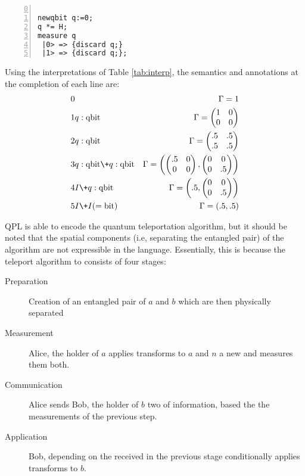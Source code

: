 \begin{Verbatim}[numbers=left,numbersep=6pt,firstnumber=0]

newqbit q:=0;
q *= H;
measure q
 |0> => {discard q;}
 |1> => {discard q;};
\end{Verbatim}

Using the interpretations of Table \ref{tab:interp}, the semantics and annotations at the
completion of each line are:
\begin{eqnarray*}
  0 & &\Gamma=1\\
  1 & q:\text{qbit} & \Gamma=\begin{pmatrix}1&0\\0&0\end{pmatrix}\\
  2 & q:\text{qbit} & \Gamma=\begin{pmatrix}.5&.5\\.5&.5\end{pmatrix}\\
  3 & q:\text{qbit} \+ q:\text{qbit} & \Gamma=\left( \begin{pmatrix}.5&0\\0&0\end{pmatrix},
    \begin{pmatrix}0&0\\0&.5\end{pmatrix}\right)\\
  4 & I \+ q:\text{qbit} & \Gamma=\left( .5, \begin{pmatrix}0&0\\0&.5\end{pmatrix}\right)\\
  5 & I\+I (=\text{bit}) & \Gamma=(.5,.5)
\end{eqnarray*}

QPL is able to encode the quantum teleportation algorithm, but it should be noted that the spatial
components (i.e, separating the entangled pair) of the algorithm are not expressible in the
language. Essentially, this is because the teleport algorithm to consists of four stages:
\begin{description}
  \item[Preparation] Creation of an entangled pair of \qubits $a$ and $b$ which are then physically
    separated
  \item[Measurement] Alice, the holder of $a$ applies transforms to $a$ and $n$ a new \qbit and
    measures them both.
  \item[Communication] Alice sends Bob, the holder of $b$ two \bits of information, based the the
    measurements of the previous step.
  \item[Application] Bob, depending on the \bits received in the previous stage conditionally
    applies transforms to $b$.
\end{description}

